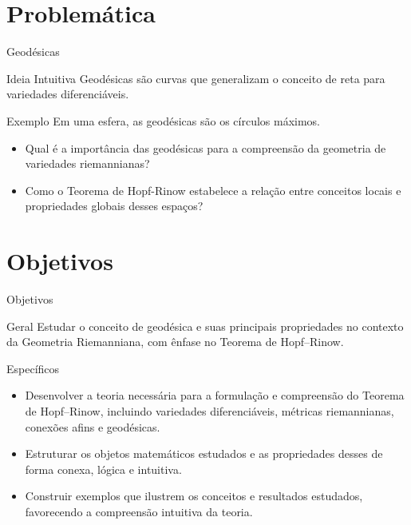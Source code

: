 \documentclass[aspectratio=169]{beamer}
\begin{document}
\section{Problemática}

\begin{frame}{Geodésicas}
    \begin{block}{Ideia Intuitiva}
        Geodésicas são curvas que generalizam o conceito de reta para variedades diferenciáveis.
    \end{block}
    \pause
    \begin{block}{Exemplo}
        Em uma esfera, as geodésicas são os círculos máximos.
    \end{block}
\end{frame}

\begin{frame}
    \begin{itemize}
        \item Qual é a importância das geodésicas para a compreensão da geometria de variedades riemannianas? \\
        \item Como o Teorema de Hopf-Rinow estabelece a relação entre conceitos locais e propriedades globais desses espaços?
    \end{itemize}
\end{frame}

\section{Objetivos}

\begin{frame}{Objetivos}
    \begin{alertblock}{Geral}
        Estudar o conceito de geodésica e suas principais propriedades no contexto da Geometria Riemanniana, com ênfase no Teorema de Hopf–Rinow.
    \end{alertblock}
    \begin{block}{Específicos}
        \begin{itemize}
            \item Desenvolver a teoria necessária para a formulação e compreensão do Teorema de Hopf–Rinow, incluindo variedades diferenciáveis, métricas riemannianas, conexões afins e geodésicas.
            \item Estruturar os objetos matemáticos estudados e as propriedades desses de forma conexa, lógica e intuitiva.
            \item Construir exemplos que ilustrem os conceitos e resultados estudados, favorecendo a compreensão intuitiva da teoria.
        \end{itemize}
    \end{block}
\end{frame}
\end{document}
